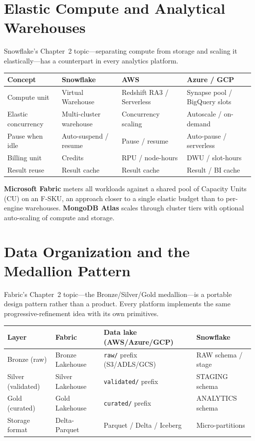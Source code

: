 \section{Elastic Compute and Analytical Warehouses}
%
Snowflake's Chapter~2 topic---separating compute from storage and scaling it elastically---has a
counterpart in every analytics platform.

\begin{center}
\footnotesize
\begin{tabular}{@{}p{2.8cm}p{3.2cm}p{3.2cm}p{3.2cm}@{}}
\toprule
\textbf{Concept} & \textbf{Snowflake} & \textbf{AWS} & \textbf{Azure / GCP} \\
\midrule
Compute unit & Virtual Warehouse & Redshift RA3 / Serverless & Synapse pool / BigQuery slots \\
Elastic concurrency & Multi-cluster warehouse & Concurrency scaling & Autoscale / on-demand \\
Pause when idle & Auto-suspend / resume & Pause / resume & Auto-pause / serverless \\
Billing unit & Credits & RPU / node-hours & DWU / slot-hours \\
Result reuse & Result cache & Result cache & Result / BI cache \\
\bottomrule
\end{tabular}
\end{center}

\noindent \textbf{Microsoft Fabric} meters all workloads against a shared pool of Capacity Units
(CU) on an F-SKU, an approach closer to a single elastic budget than to per-engine warehouses.
\textbf{MongoDB Atlas} scales through cluster tiers with optional auto-scaling of compute and storage.

\section{Data Organization and the Medallion Pattern}
%
Fabric's Chapter~2 topic---the Bronze/Silver/Gold medallion---is a portable design pattern rather
than a product. Every platform implements the same progressive-refinement idea with its own primitives.

\begin{center}
\footnotesize
\begin{tabular}{@{}p{2.6cm}p{3.4cm}p{3.4cm}p{3.0cm}@{}}
\toprule
\textbf{Layer} & \textbf{Fabric} & \textbf{Data lake (AWS/Azure/GCP)} & \textbf{Snowflake} \\
\midrule
Bronze (raw) & Bronze Lakehouse & \texttt{raw/} prefix (S3/ADLS/GCS) & RAW schema / stage \\
Silver (validated) & Silver Lakehouse & \texttt{validated/} prefix & STAGING schema \\
Gold (curated) & Gold Lakehouse & \texttt{curated/} prefix & ANALYTICS schema \\
Storage format & Delta-Parquet & Parquet / Delta / Iceberg & Micro-partitions \\
\bottomrule
\end{tabular}
\end{center}

